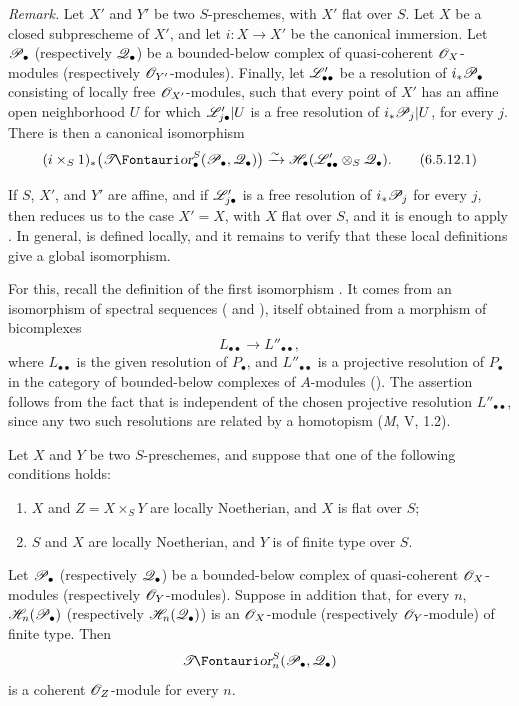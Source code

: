 \begin{env}[6.5.12]
\label{III.6.5.12}
\emph{Remark.}
Let $X'$ and $Y'$ be two $S$-preschemes, with $X'$ flat over
$S$.  Let $X$ be a closed subprescheme of $X'$, and let
$i:X\to X'$ be the canonical immersion.  Let $\mathscr{P}_\bullet$
(respectively $\mathscr{Q}_\bullet$) be a bounded-below complex of
quasi-coherent $\mathscr{O}_X$-modules (respectively
$\mathscr{O}_{Y'}$-modules).  Finally, let $\mathscr{L}'_{\bullet\bullet}$
be a resolution of $i_*\mathscr{P}_\bullet$ consisting of locally free
$\mathscr{O}_{X'}$-modules, such that every point of $X'$ has an
affine open neighborhood $U$ for which
$\mathscr{L}'_{j\bullet}|U$ is a free resolution of
$i_*\mathscr{P}_j|U$, for every $j$.  There is then a canonical
isomorphism
\[
  (i\times_S1)_*
  \bigl(\shTor_\bullet^S(\sh P_\bullet,\sh Q_\bullet)\bigr)
  \xrightarrow{\sim}
  \sh H_\bullet(\sh L'_{\bullet\bullet}\otimes_S\sh Q_\bullet).
  \tag{6.5.12.1}\label{III.6.5.12.1}
\]

If $S$, $X'$, and $Y'$ are affine, and if
$\mathscr{L}'_{j\bullet}$ is a free resolution of $i_*\mathscr{P}_j$ for
every $j$, then  reduces us to the case
$X'=X$, with $X$ flat over $S$, and it is enough to apply
.  In general,  is defined
locally, and it remains to verify that these local definitions
give a global isomorphism.

For this, recall the definition of the first isomorphism
.  It comes from an isomorphism of spectral
sequences ( and ), itself
obtained from a morphism of bicomplexes
\[
  L_{\bullet\bullet}\longrightarrow L''_{\bullet\bullet},
\]
where $L_{\bullet\bullet}$ is the given resolution of
$P_\bullet$, and
$L''_{\bullet\bullet}$ is a projective resolution of
$P_\bullet$ in the category of bounded-below complexes of
$A$-modules ().  The assertion follows from
the fact that  is independent of the chosen
projective resolution $L''_{\bullet\bullet}$, since any two such
resolutions are related by a homotopism (\emph{M}, V, 1.2).
\end{env}

\begin{proposition}[6.5.13]
\label{III.6.5.13}
Let $X$ and $Y$ be two $S$-preschemes, and suppose that one of
the following conditions holds:
\begin{enumerate}
  \item[(i)] $X$ and $Z=X\times_SY$ are locally Noetherian, and
    $X$ is flat over $S$;
  \item[(ii)] $S$ and $X$ are locally Noetherian, and $Y$ is of
    finite type over $S$.
\end{enumerate}
Let $\mathscr{P}_\bullet$ (respectively $\mathscr{Q}_\bullet$) be a
bounded-below complex of quasi-coherent $\mathscr{O}_X$-modules
(respectively $\mathscr{O}_Y$-modules).  Suppose in addition that, for
every $n$, $\mathscr{H}_n(\mathscr{P}_\bullet)$ (respectively
$\mathscr{H}_n(\mathscr{Q}_\bullet)$) is an $\mathscr{O}_X$-module
(respectively $\mathscr{O}_Y$-module) of finite type.  Then
\[
  \shTor_n^S(\sh P_\bullet,\sh Q_\bullet)
\]
is a coherent $\mathscr{O}_Z$-module for every $n$.
\end{proposition}


